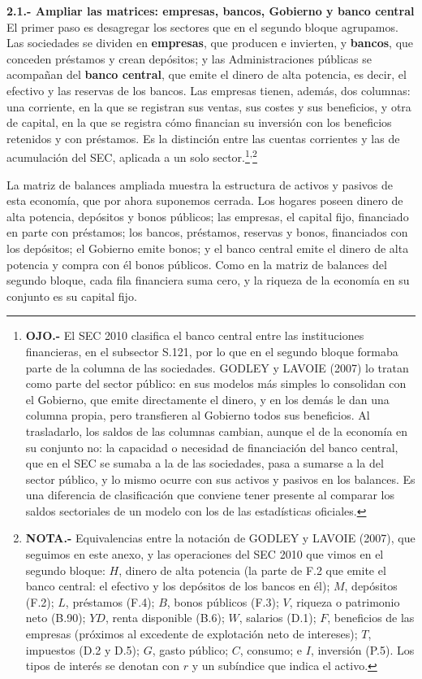\documentclass[10pt,a4paper]{article}
\newcounter{anexo}
\begin{document}
\textbf{2.1.- Ampliar las matrices: empresas, bancos, Gobierno y banco central}
El primer paso es desagregar los sectores que en el segundo bloque agrupamos. Las sociedades se dividen en \textbf{empresas}, que producen e invierten, y \textbf{bancos}, que conceden préstamos y crean depósitos; y las Administraciones públicas se acompañan del \textbf{banco central}, que emite el dinero de alta potencia, es decir, el efectivo y las reservas de los bancos. Las empresas tienen, además, dos columnas: una corriente, en la que se registran sus ventas, sus costes y sus beneficios, y otra de capital, en la que se registra cómo financian su inversión con los beneficios retenidos y con préstamos. Es la distinción entre las cuentas corrientes y las de acumulación del SEC, aplicada a un solo sector.\footnote{%
    \textbf{OJO.-} El SEC 2010 clasifica el banco central entre las instituciones financieras, en el subsector S.121, por lo que en el segundo bloque formaba parte de la columna de las sociedades. GODLEY y LAVOIE (2007) lo tratan como parte del sector público: en sus modelos más simples lo consolidan con el Gobierno, que emite directamente el dinero, y en los demás le dan una columna propia, pero transfieren al Gobierno todos sus beneficios. Al trasladarlo, los saldos de las columnas cambian, aunque el de la economía en su conjunto no: la capacidad o necesidad de financiación del banco central, que en el SEC se sumaba a la de las sociedades, pasa a sumarse a la del sector público, y lo mismo ocurre con sus activos y pasivos en los balances. Es una diferencia de clasificación que conviene tener presente al comparar los saldos sectoriales de un modelo con los de las estadísticas oficiales.
}\textsuperscript{,}\footnote{%
    \textbf{NOTA.-} Equivalencias entre la notación de GODLEY y LAVOIE (2007), que seguimos en este anexo, y las operaciones del SEC 2010 que vimos en el segundo bloque: $H$, dinero de alta potencia (la parte de F.2 que emite el banco central: el efectivo y los depósitos de los bancos en él); $M$, depósitos (F.2); $L$, préstamos (F.4); $B$, bonos públicos (F.3); $V$, riqueza o patrimonio neto (B.90); $YD$, renta disponible (B.6); $W$, salarios (D.1); $F$, beneficios de las empresas (próximos al excedente de explotación neto de intereses); $T$, impuestos (D.2 y D.5); $G$, gasto público; $C$, consumo; e $I$, inversión (P.5). Los tipos de interés se denotan con $r$ y un subíndice que indica el activo.
}

La matriz de balances ampliada muestra la estructura de activos y pasivos de esta economía, que por ahora suponemos cerrada. Los hogares poseen dinero de alta potencia, depósitos y bonos públicos; las empresas, el capital fijo, financiado en parte con préstamos; los bancos, préstamos, reservas y bonos, financiados con los depósitos; el Gobierno emite bonos; y el banco central emite el dinero de alta potencia y compra con él bonos públicos. Como en la matriz de balances del segundo bloque, cada fila financiera suma cero, y la riqueza de la economía en su conjunto es su capital fijo.
\end{document}
